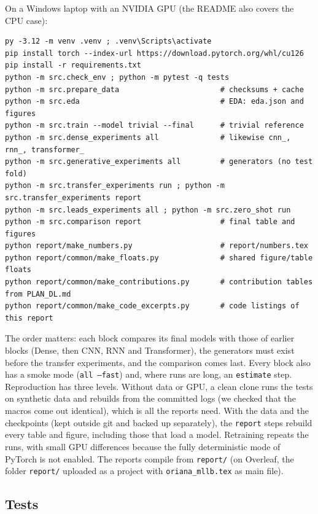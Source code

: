 On a Windows laptop with an NVIDIA GPU (the README also covers the CPU case):
\begin{lstlisting}[language={},numbers=none,caption={Commands to reproduce the project, from the folder \texttt{ptbxl-dl}.},label={lst:repro}]
py -3.12 -m venv .venv ; .venv\Scripts\activate
pip install torch --index-url https://download.pytorch.org/whl/cu126
pip install -r requirements.txt
python -m src.check_env ; python -m pytest -q tests
python -m src.prepare_data                       # checksums + cache
python -m src.eda                                # EDA: eda.json and figures
python -m src.train --model trivial --final      # trivial reference
python -m src.dense_experiments all              # likewise cnn_, rnn_, transformer_
python -m src.generative_experiments all         # generators (no test fold)
python -m src.transfer_experiments run ; python -m src.transfer_experiments report
python -m src.leads_experiments all ; python -m src.zero_shot run
python -m src.comparison report                  # final table and figures
python report/make_numbers.py                    # report/numbers.tex
python report/common/make_floats.py              # shared figure/table floats
python report/common/make_contributions.py       # contribution tables from PLAN_DL.md
python report/common/make_code_excerpts.py       # code listings of this report
\end{lstlisting}

The order matters: each block compares its final models with those of earlier blocks (Dense, then CNN,
RNN and Transformer), the generators must exist before the transfer experiments, and the comparison comes
last. Every block also has a smoke mode (\texttt{all --fast}) and, where runs are long, an \texttt{estimate}
step. Reproduction has three levels. Without data or GPU, a clean clone runs the tests on synthetic data
and rebuilds  from the committed logs (we checked that the macros come out identical),
which is all the reports need. With the data and the checkpoints (kept outside git and backed up
separately), the \texttt{report} steps rebuild every table and figure, including those that load a model.
Retraining repeats the runs, with small GPU differences because the fully deterministic mode of PyTorch is
not enabled. The reports compile from \texttt{report/} (on Overleaf, the folder \texttt{report/} uploaded as a
project with \texttt{oriana\_mllb.tex} as main file).

\subsection{Tests}

